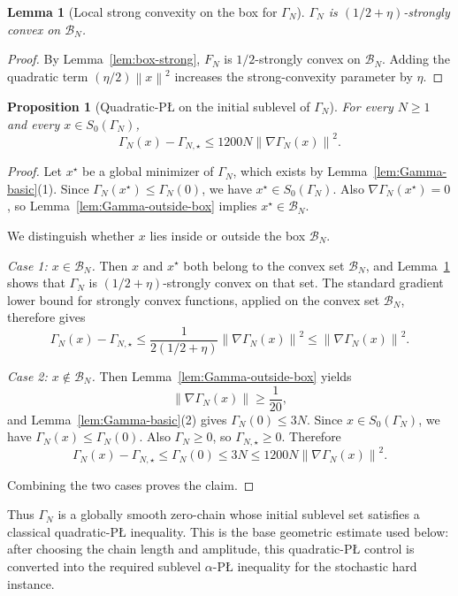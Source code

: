 \documentclass[11pt]{article}
\newtheorem{proposition}[theorem]{Proposition}
\newtheorem{lemma}[theorem]{Lemma}
\newcommand{\norm}[1]{\left\lVert #1\right\rVert}
\begin{document}
\begin{lemma}[Local strong convexity on the box for $\Gamma_N$]
\label{lem:Gamma-box-strong}
$\Gamma_N$ is $(1/2+\eta)$-strongly convex on $\mathcal B_N$.
\end{lemma}

\begin{proof}
By Lemma~\ref{lem:box-strong}, $F_N$ is $1/2$-strongly convex on $\mathcal B_N$.
Adding the quadratic term $(\eta/2)\norm{x}^2$ increases the strong-convexity parameter by $\eta$.
\end{proof}

\begin{proposition}[Quadratic-P\L{} on the initial sublevel of $\Gamma_N$]
\label{prop:Gamma-quadratic-PL}
For every $N\ge 1$ and every $x\in S_0(\Gamma_N)$,
\[
\Gamma_N(x)-\Gamma_{N,\star}\le 1200N\norm{\nabla \Gamma_N(x)}^2.
\]
\end{proposition}

\begin{proof}
Let $x^\star$ be a global minimizer of $\Gamma_N$, which exists by Lemma~\ref{lem:Gamma-basic}(1).
Since $\Gamma_N(x^\star)\le \Gamma_N(0)$, we have $x^\star\in S_0(\Gamma_N)$.
Also $\nabla \Gamma_N(x^\star)=0$, so Lemma~\ref{lem:Gamma-outside-box} implies $x^\star\in \mathcal B_N$.

We distinguish whether $x$ lies inside or outside the box $\mathcal B_N$.

\emph{Case 1: $x\in \mathcal B_N$.}
Then $x$ and $x^\star$ both belong to the convex set $\mathcal B_N$, and Lemma~\ref{lem:Gamma-box-strong} shows that $\Gamma_N$ is $(1/2+\eta)$-strongly convex on that set.
The standard gradient lower bound for strongly convex functions, applied on the convex set \(\mathcal B_N\), therefore gives
\[
\Gamma_N(x)-\Gamma_{N,\star}\le \frac{1}{2(1/2+\eta)}\norm{\nabla \Gamma_N(x)}^2\le \norm{\nabla \Gamma_N(x)}^2.
\]

\emph{Case 2: $x\notin \mathcal B_N$.}
Then Lemma~\ref{lem:Gamma-outside-box} yields
\[
\norm{\nabla \Gamma_N(x)}\ge \frac{1}{20},
\]
and Lemma~\ref{lem:Gamma-basic}(2) gives $\Gamma_N(0)\le 3N$.
Since \(x\in S_0(\Gamma_N)\), we have \(\Gamma_N(x)\le \Gamma_N(0)\). Also \(\Gamma_N\ge0\), so
\(\Gamma_{N,\star}\ge 0\). Therefore
\[
\Gamma_N(x)-\Gamma_{N,\star}\le \Gamma_N(0)\le 3N\le 1200N\norm{\nabla \Gamma_N(x)}^2.
\]

Combining the two cases proves the claim.
\end{proof}

Thus \(\Gamma_N\) is a globally smooth zero-chain whose initial sublevel set satisfies a classical quadratic-P\L{}
inequality. This is the base geometric estimate used below: after choosing the chain length and amplitude, this
quadratic-P\L{} control is converted into the required sublevel \(\alpha\)-P\L{} inequality for the stochastic hard
instance.
\end{document}
